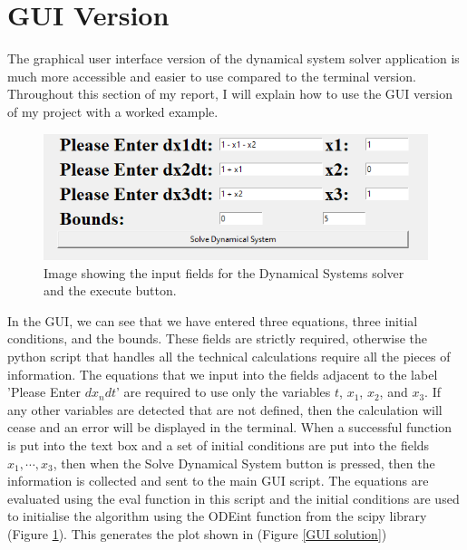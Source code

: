 \documentclass[12pt]{report}
\begin{document}
\section*{GUI Version}
The graphical user interface version of the dynamical system solver application is much more accessible and easier to use compared to the terminal version. Throughout this section of my report, I will explain how to use the GUI version of my project with a worked example.
\begin{figure}[H]
    \centering
    \includegraphics[scale = 0.8]{demo 1.png}
    \caption{Image showing the input fields for the Dynamical Systems solver and the execute button.}
    \label{GUI}
\end{figure}
In the GUI, we can see that we have entered three equations, three initial conditions, and the bounds. These fields are strictly required, otherwise the python script that handles all the technical calculations require all the pieces of information. The equations that we input into the fields adjacent to the label 'Please Enter $dx_{n}dt$' are required to use only the variables $t$, $x_{1}$, $x_{2}$, and $x_{3}$. If any other variables are detected that are not defined, then the calculation will cease and an error will be displayed in the terminal. When a successful function is put into the text box and a set of initial conditions are put into the fields $x_{1}, \cdots, x_{3}$, then when the Solve Dynamical System button is pressed, then the information is collected and sent to the main GUI script. The equations are evaluated using the eval function in this script and the initial conditions are used to initialise the algorithm using the ODEint function from the scipy library (Figure \ref*{GUI}). This generates the plot shown in (Figure \ref*{GUI solution})
\smallskip
\end{document}
